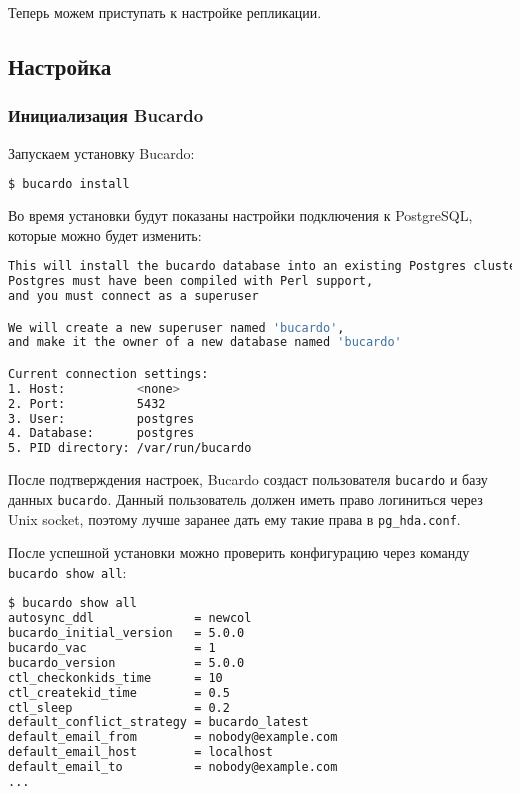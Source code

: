 Теперь можем приступать к настройке репликации.

\subsection{Настройка}

\subsubsection{Инициализация Bucardo}

Запускаем установку Bucardo:

\begin{lstlisting}[language=Bash,label=lst:bucardo5,caption=Инициализация Bucardo]
$ bucardo install
\end{lstlisting}

Во время установки будут показаны настройки подключения к PostgreSQL, которые можно будет изменить:

\begin{lstlisting}[language=Bash,label=lst:bucardo6,caption=Инициализация Bucardo]
This will install the bucardo database into an existing Postgres cluster.
Postgres must have been compiled with Perl support,
and you must connect as a superuser

We will create a new superuser named 'bucardo',
and make it the owner of a new database named 'bucardo'

Current connection settings:
1. Host:          <none>
2. Port:          5432
3. User:          postgres
4. Database:      postgres
5. PID directory: /var/run/bucardo
\end{lstlisting}

После подтверждения настроек, Bucardo создаст пользователя \lstinline!bucardo! и базу данных \lstinline!bucardo!.
Данный пользователь должен иметь право логиниться через Unix socket, поэтому лучше заранее дать ему такие права в \lstinline!pg_hda.conf!.

После успешной установки можно проверить конфигурацию через команду \lstinline!bucardo show all!:

\begin{lstlisting}[language=Bash,label=lst:bucardo-status1,caption=Инициализация Bucardo]
$ bucardo show all
autosync_ddl              = newcol
bucardo_initial_version   = 5.0.0
bucardo_vac               = 1
bucardo_version           = 5.0.0
ctl_checkonkids_time      = 10
ctl_createkid_time        = 0.5
ctl_sleep                 = 0.2
default_conflict_strategy = bucardo_latest
default_email_from        = nobody@example.com
default_email_host        = localhost
default_email_to          = nobody@example.com
...
\end{lstlisting}

